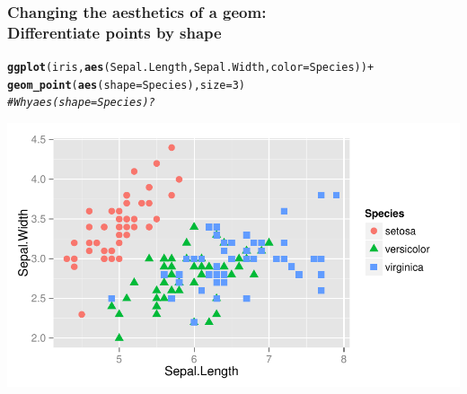 \documentclass{beamer}\usepackage[]{graphicx}\usepackage[]{color}
\makeatletter
\newcommand{\hlnum}[1]{\textcolor[rgb]{0.686,0.059,0.569}{#1}}%
\newcommand{\hlcom}[1]{\textcolor[rgb]{0.678,0.584,0.686}{\textit{#1}}}%
\newcommand{\hlopt}[1]{\textcolor[rgb]{0,0,0}{#1}}%
\newcommand{\hlstd}[1]{\textcolor[rgb]{0.345,0.345,0.345}{#1}}%
\newcommand{\hlkwc}[1]{\textcolor[rgb]{0.333,0.667,0.333}{#1}}%
\newcommand{\hlkwd}[1]{\textcolor[rgb]{0.737,0.353,0.396}{\textbf{#1}}}%
\newenvironment{kframe}{%
 \def\at@end@of@kframe{}%
 \ifinner\ifhmode%
  \def\at@end@of@kframe{\end{minipage}}%
  \begin{minipage}{\columnwidth}%
 \fi\fi%
 \def\FrameCommand##1{\hskip\@totalleftmargin \hskip-\fboxsep
 \colorbox{shadecolor}{##1}\hskip-\fboxsep
     \hskip-\linewidth \hskip-\@totalleftmargin \hskip\columnwidth}%
 \MakeFramed {\advance\hsize-\width
   \@totalleftmargin\z@ \linewidth\hsize
   \@setminipage}}%
 {\par\unskip\endMakeFramed%
 \at@end@of@kframe}
\newenvironment{knitrout}{}{} %
\makeatother
\begin{document}
\begin{frame}[fragile]
\frametitle{Changing the aesthetics of a geom: \\Differentiate points by shape}
\begin{knitrout}\footnotesize
{}\color{fgcolor}\begin{kframe}
\begin{alltt}
\hlkwd{ggplot}\hlstd{(iris,} \hlkwd{aes}\hlstd{(Sepal.Length, Sepal.Width,} \hlkwc{color} \hlstd{= Species))} \hlopt{+}
    \hlkwd{geom_point}\hlstd{(}\hlkwd{aes}\hlstd{(}\hlkwc{shape} \hlstd{= Species),} \hlkwc{size} \hlstd{=} \hlnum{3}\hlstd{)}
\hlcom{# Why aes(shape = Species)?}
\end{alltt}
\end{kframe}

{\centering \includegraphics[width=.75\linewidth]{figure/first_plot_shape_} 

}



\end{knitrout}
\end{frame}

\end{document}
